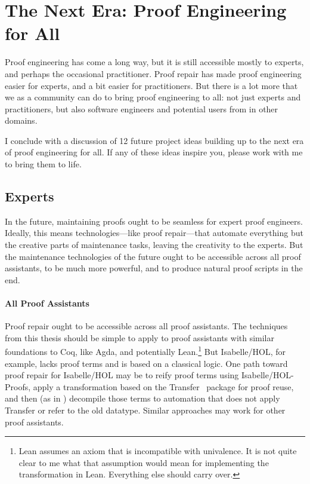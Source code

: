\section*{The Next Era: Proof Engineering for All}


Proof engineering has come a long way, but it is still accessible mostly to experts, and perhaps the occasional practitioner.
Proof repair has made proof engineering easier for experts, and a bit easier for practitioners.
But there is a lot more that we as a community can do to bring proof engineering to all: not just experts and practitioners,
but also software engineers and potential users from in other domains.

I conclude with a discussion of 12 future project ideas building up to the next era of proof engineering for all.
If any of these ideas inspire you, please work with me to bring them to life.

\subsection*{Experts}

In the future, maintaining proofs ought to be seamless for expert proof engineers.
Ideally, this means technologies---like proof repair---that automate everything but the creative parts of maintenance tasks,
leaving the creativity to the experts.
But the maintenance technologies of the future ought to be accessible across all proof assistants,
to be much more powerful,
and to produce natural proof scripts in the end.

\paragraph{All Proof Assistants}
Proof repair ought to be accessible across all proof assistants.
The techniques from this thesis should be simple to apply to proof assistants with similar foundations to Coq, like Agda,
and potentially Lean.\footnote{Lean assumes an axiom that is incompatible with univalence.
It is not quite clear to me what that assumption would mean for implementing the \toolnamec transformation in Lean.
Everything else should carry over.}
But Isabelle/HOL, for example, lacks proof terms and is based on a classical logic.
One path toward proof repair for Isabelle/HOL may be to reify proof terms using
Isabelle/HOL-Proofs, apply a transformation based on the Transfer~\cite{Huffman2013} package for proof reuse, and then (as in \toolnamec) decompile those terms to automation that does 
not apply Transfer or refer to the old datatype.
Similar approaches may work for other proof assistants.

